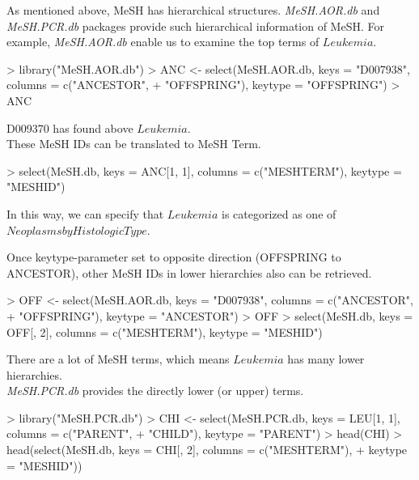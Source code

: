 \documentclass[11pt]{article}
\newcommand{\Rpackage}[1]{{\textit{#1}}}
\begin{document}
As mentioned above, MeSH has hierarchical structures. \Rpackage{MeSH.AOR.db} and \Rpackage{MeSH.PCR.db} packages provide such hierarchical information of MeSH. For example, \Rpackage{MeSH.AOR.db} enable us to examine the top terms of $Leukemia$.

\begin{center}
\begin{Schunk}
\begin{Sinput}
> library("MeSH.AOR.db")
> ANC <- select(MeSH.AOR.db, keys = "D007938", columns = c("ANCESTOR", 
+     "OFFSPRING"), keytype = "OFFSPRING")
> ANC
\end{Sinput}
\end{Schunk}
\end{center}
D009370 has found above $Leukemia$.\\

These MeSH IDs can be translated to MeSH Term.
\begin{center}
\begin{Schunk}
\begin{Sinput}
> select(MeSH.db, keys = ANC[1, 1], columns = c("MESHTERM"), keytype = "MESHID")
\end{Sinput}
\end{Schunk}
\end{center}
In this way, we can specify that $Leukemia$ is categorized as one of $Neoplasms by Histologic Type$.

Once keytype-parameter set to opposite direction (OFFSPRING to ANCESTOR), other MeSH IDs in lower hierarchies also can be retrieved.
\begin{center}
\begin{Schunk}
\begin{Sinput}
> OFF <- select(MeSH.AOR.db, keys = "D007938", columns = c("ANCESTOR", 
+     "OFFSPRING"), keytype = "ANCESTOR")
> OFF
> select(MeSH.db, keys = OFF[, 2], columns = c("MESHTERM"), keytype = "MESHID")
\end{Sinput}
\end{Schunk}
\end{center}
There are a lot of MeSH terms, which means $Leukemia$ has many lower hierarchies.\\

\Rpackage{MeSH.PCR.db} provides the directly lower (or upper) terms.
\begin{center}
\begin{Schunk}
\begin{Sinput}
> library("MeSH.PCR.db")
> CHI <- select(MeSH.PCR.db, keys = LEU[1, 1], columns = c("PARENT", 
+     "CHILD"), keytype = "PARENT")
> head(CHI)
> head(select(MeSH.db, keys = CHI[, 2], columns = c("MESHTERM"), 
+     keytype = "MESHID"))
\end{Sinput}
\end{Schunk}
\end{center}
\end{document}
